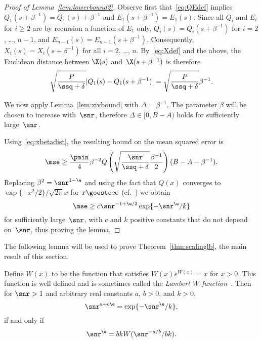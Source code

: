 \begin{proof}[Proof of Lemma~\ref{lem:lowerbound2}]
  Observe first that~\eqref{eq:QEdef} implies $Q_1(s + \beta^{-1}) = Q_1(s) +
  \beta^{-1}$ and $E_1(s + \beta^{-1}) = E_1(s)$. Since all $Q_i$ and $E_i$ for
  $i \ge 2$ are by recursion a function of $E_1$ only, $Q_i(s) = Q_i(s +
  \beta^{-1})$ for $i = 2$, \dots, $n-1$, and $E_{n-1}(s) = E_{n-1}(s +
  \beta^{-1})$. Consequently,  $X_i(s) = X_i(s + \beta^{-1})$ for all $i =
  2$, \dots, $n$. By~\eqref{eq:Xdef} and the above, the Euclidean distance
  between $\X(s)$ and~$\X(s+\beta^{-1})$ is therefore
  \begin{equation}
    \label{eq:xbetadist}
    \sqrt{\frac{P}{\ssq + \delta}} |Q_1(s) - Q_1(s+\beta^{-1})| 
    = \sqrt{\frac{P}{\ssq + \delta}} \beta^{-1}.
  \end{equation}

  We now apply Lemma~\ref{lem:zivbound} with $\Delta = \beta^{-1}$. The
  parameter $\beta$ will be chosen to increase with~$\snr$, therefore $\Delta
  \in [0, B-A)$ holds for sufficiently large~$\snr$.

  Using~\eqref{eq:xbetadist}, the resulting bound on the mean squared error is
  \begin{equation*}
    \mse \ge \frac{\pmin}{4} \beta^{-2}
    Q\left (\sqrt{\frac{\snr}{\ssq + \delta}} \frac{\beta^{-1}}{2} \right)
    (B-A-\beta^{-1}
    ).
  \end{equation*}
  Replacing $\beta^2 = \snr^{1-\e}$ and using the fact that $Q(x)$ converges to
  $\exp\{-x^2/2\}/\sqrt{2\pi}x$ for $x \goesto \infty$
  (cf.~\cite{AbramowitzS1964}) we obtain
  \begin{equation*}
    \mse \ge c \snr^{-1 + \e/2} \exp\{-\snr^\e/k\}
  \end{equation*}
  for sufficiently large~$\snr$, with $c$ and $k$ positive constants that do
  not depend on~$\snr$, thus proving the lemma.
\end{proof}

The following lemma will be used to prove Theorem~\ref{thm:scalinglb}, the main
result of this section.

\begin{lemma}
  \label{lem:epssolution}
  Define $W(x)$ to be the function that satisfies $W(x)e^{W(x)} = x$ for $x >
  0$.  This function is well defined and is sometimes called the \emph{Lambert
  $W$-function}~\textnormal{\cite{CorlessGHJK1996}}. Then for $\snr > 1$ and
  arbitrary real constants $a$, $b>0$, and $k > 0$, 
  \begin{equation}
    \label{eq:epsequation}
    \snr^{a+b\e} = \exp\{-\snr^\e/k\},
  \end{equation}
  if and only if
  \begin{equation}
    \label{eq:epssolution}
    \snr^\e = bk W(\snr^{-a/b} / bk).
  \end{equation}
\end{lemma}

